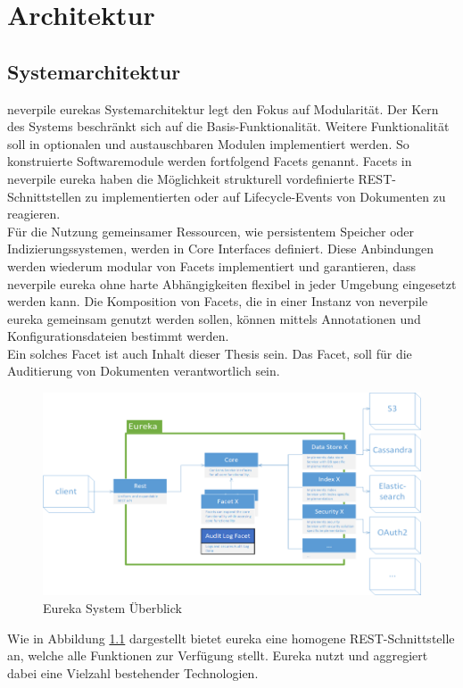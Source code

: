\chapter{Architektur}

\section{Systemarchitektur}
neverpile eurekas Systemarchitektur legt den Fokus auf Modularität. Der Kern des Systems beschränkt sich auf die Basis-Funktionalität. Weitere Funktionalität soll in optionalen und austauschbaren Modulen implementiert werden. So konstruierte Softwaremodule werden fortfolgend Facets genannt. Facets in neverpile eureka haben die Möglichkeit strukturell vordefinierte \acs{REST}-Schnittstellen zu implementierten oder auf Lifecycle-Events von Dokumenten zu reagieren.\\
Für die Nutzung gemeinsamer Ressourcen, wie persistentem Speicher oder Indizierungssystemen, werden in Core Interfaces definiert. Diese Anbindungen werden wiederum modular von Facets implementiert und garantieren, dass neverpile eureka ohne harte Abhängigkeiten flexibel in jeder Umgebung eingesetzt werden kann. Die Komposition von Facets, die in einer Instanz von neverpile eureka gemeinsam genutzt werden sollen, können mittels Annotationen und Konfigurationsdateien bestimmt werden.\\
Ein solches Facet ist auch Inhalt dieser Thesis sein. Das Facet, soll für die Auditierung von Dokumenten verantwortlich sein. 

\begin{figure}[!htb]
	\includegraphics[width=1\textwidth]{content/pictures/eureka}
	\caption{Eureka System Überblick}
	\label{fig:eureka}
\end{figure}

Wie in Abbildung \ref{fig:eureka} dargestellt bietet eureka eine homogene \acs{REST}-Schnittstelle an, welche alle Funktionen zur Verfügung stellt. Eureka nutzt und aggregiert dabei eine Vielzahl bestehender Technologien. 

